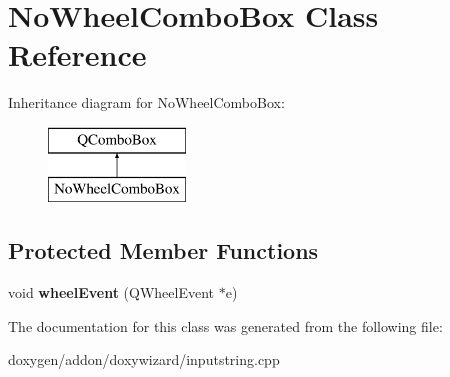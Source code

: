 \hypertarget{class_no_wheel_combo_box}{}\section{No\+Wheel\+Combo\+Box Class Reference}
\label{class_no_wheel_combo_box}
Inheritance diagram for No\+Wheel\+Combo\+Box\+:\begin{figure}[H]
\begin{center}
\leavevmode
\includegraphics[height=2.000000cm]{class_no_wheel_combo_box}
\end{center}
\end{figure}
\subsection*{Protected Member Functions}
\begin{DoxyCompactItemize}
\item 
\mbox{\label{class_no_wheel_combo_box_a06db9c7295a2f5f7acad91b13f4a53a6}} 
void {\bfseries wheel\+Event} (Q\+Wheel\+Event $\ast$e)
\end{DoxyCompactItemize}


The documentation for this class was generated from the following file\+:\begin{DoxyCompactItemize}
\item 
doxygen/addon/doxywizard/inputstring.\+cpp\end{DoxyCompactItemize}
